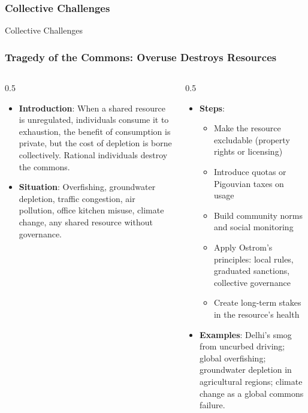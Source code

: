 \begin{frame}[fragile]\frametitle{Collective Challenges}
\begin{center}
{\Large Collective Challenges}
\end{center}
\end{frame}


\begin{frame}[fragile]\frametitle{Tragedy of the Commons: Overuse Destroys Resources}
\begin{columns}
    \begin{column}[T]{0.5\linewidth}
      \begin{itemize}
        \item \textbf{Introduction}: When a shared resource is unregulated, individuals consume it to exhaustion, the benefit of consumption is private, but the cost of depletion is borne collectively. Rational individuals destroy the commons.
        \item \textbf{Situation}: Overfishing, groundwater depletion, traffic congestion, air pollution, office kitchen misuse, climate change, any shared resource without governance.
      \end{itemize}
    \end{column}
    \begin{column}[T]{0.5\linewidth}
      \begin{itemize}
        \item \textbf{Steps}:
        \begin{itemize}
          \item Make the resource excludable (property rights or licensing)
          \item Introduce quotas or Pigouvian taxes on usage
          \item Build community norms and social monitoring
          \item Apply Ostrom's principles: local rules, graduated sanctions, collective governance
          \item Create long-term stakes in the resource's health
        \end{itemize}\item \textbf{Examples}: Delhi's smog from uncurbed driving; global overfishing; groundwater depletion in agricultural regions; climate change as a global commons failure.
      \end{itemize}
    \end{column}
  \end{columns}
\end{frame}

